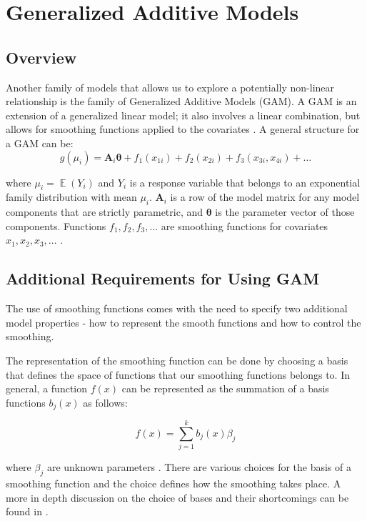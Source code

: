 \section{Generalized Additive Models}

\subsection{Overview}
Another family of models that allows us to explore a potentially non-linear relationship is the family of Generalized Additive Models (GAM). A GAM is an extension of a generalized linear model; it also involves a linear combination, but allows for smoothing functions applied to the covariates \citep{hastie2017generalized}. A general structure for a GAM can be: 
\setlength\abovedisplayskip{4pt}
\setlength\belowdisplayskip{4pt}
\begin{equation*}
g\left(\mu_{i}\right)=\mathbf{A}_{i} \boldsymbol{\theta}+f_{1}\left(x_{1 i}\right)+f_{2}\left(x_{2 i}\right)+f_{3}\left(x_{3 i}, x_{4 i}\right)+\ldots
\end{equation*}

where $\mu_{i} = \mathop{\mathbb{E}}(Y_i)$  and $Y_i$ is a response variable that belongs to an exponential family distribution with mean $\mu_{i}$. $\mathbf{A}_{i}$ is a row of the model matrix for any model components that are strictly parametric, and $\boldsymbol{\theta}$ is the parameter vector of those components. Functions $f_1, f_2, f_3, \ldots$ are smoothing functions for covariates $x_1, x_2, x_3, \ldots$  \citep{wood2017generalized}. 

\subsection{Additional Requirements for Using GAM}

The use of smoothing functions comes with the need to specify two additional model properties - how to represent the smooth functions and how to control the smoothing. 

The representation of the smoothing function can be done by choosing a basis that defines the space of functions that our smoothing functions belongs to. In general, a function $f(x)$ can be represented as the summation of a basis functions $b_{j}(x)$ as follows: 

$$
f(x)=\sum_{j=1}^{k} b_{j}(x) \beta_{j}
$$

where $\beta_{j}$ are unknown parameters  \citep{wood2017generalized}. There are various choices for the basis of a smoothing function and the choice defines how the smoothing takes place. A more in depth discussion on the choice of bases and their shortcomings can be found in . 


